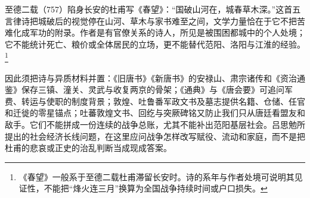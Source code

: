 至德二载（757）陷身长安的杜甫写《春望》：“国破山河在，城春草木深。”这首五言律诗把城破后的视觉停在山河、草木与家书难至之间，文学力量恰在于它不把苦难化成军功的附录。作者是有官僚关系的诗人，所见是被围困都城中的个人处境；它不能统计死亡、粮价或全体居民的立场，更不能替代范阳、洛阳与江淮的经验。%
\footnote{《春望》一般系于至德二载杜甫滞留长安时。诗的系年与作者处境可说明其见证性，不能把“烽火连三月”换算为全国战争持续时间或户口损失。}

因此须把诗与异质材料并置：《旧唐书》《新唐书》的安禄山、肃宗诸传和《资治通鉴》保存三镇、潼关、灵武与收复两京的骨架；《通典》与《唐会要》可追问军费、转运与使职的制度背景；敦煌、吐鲁番军政文书及墓志提供名籍、仓储、任官和迁徙的零星锚点；吐蕃敦煌文书、回纥与突厥碑铭又防止我们只从唐廷看盟友和敌手。它们不能拼成一份连续的战争总账，尤其不能补出范阳基层社会。吕思勉所提出的社会经济长线问题，在这里应问战争怎样改写赋役、流动和家庭，而不是把杜甫的悲哀或正史的治乱判断当成现成答案。
